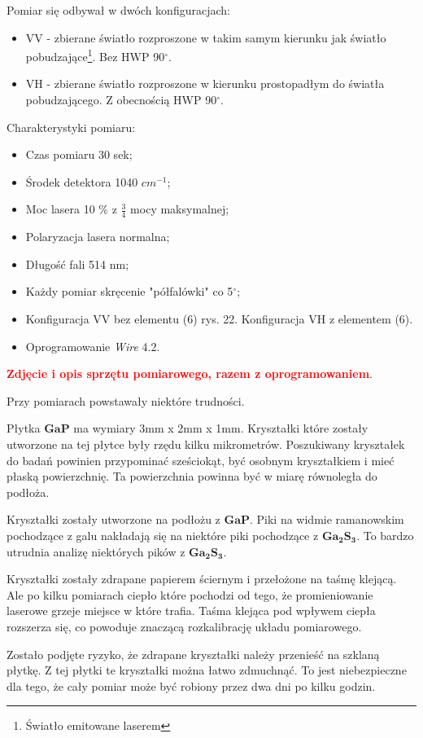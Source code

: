 Pomiar się odbywał w dwóch konfiguracjach:
\begin{itemize}
	\item VV - zbierane światło rozproszone w takim samym kierunku jak światło pobudzające\footnote{Światło emitowane laserem}. Bez HWP 90$^{\circ}$.
	\item VH - zbierane światło rozproszone w kierunku prostopadłym do światła pobudzającego. Z obecnością HWP 90$^{\circ}$.
\end{itemize} 

Charakterystyki pomiaru:
\begin{itemize}
	\item Czas pomiaru 30 sek;
	\item Środek detektora 1040 $cm^{-1}$;
	\item Moc lasera 10 \% z $\frac{3}{4}$ mocy maksymalnej;
	\item Polaryzacja lasera normalna;
	\item Długość fali 514 nm;
	\item Każdy pomiar skręcenie "półfalówki" co 5$^{\circ}$;
	\item Konfiguracja VV bez elementu (6) rys. 22. Konfiguracja VH z elementem (6).
	\item Oprogramowanie \textit{Wire} 4.2.
\end{itemize}

\textbf{\textcolor{red}{Zdjęcie i opis sprzętu pomiarowego, razem z oprogramowaniem}}.

Przy pomiarach powstawały niektóre trudności.

Płytka $\mathbf{GaP}$ ma wymiary 3mm x 2mm x 1mm. Kryształki które zostały utworzone na tej płytce były rzędu kilku mikrometrów. Poszukiwany kryształek do badań powinien przypominać sześciokąt, być osobnym kryształkiem i mieć płaską powierzchnię. Ta powierzchnia powinna być w miarę równoległa do podłoża.

Kryształki zostały utworzone na podłożu z $\mathbf{GaP}$. Piki na widmie ramanowskim pochodzące z galu nakładają się na niektóre piki pochodzące z $\mathbf{Ga_{2}S_{3}}$. To bardzo utrudnia analizę niektórych pików z $\mathbf{Ga_{2}S_{3}}$.

Kryształki zostały zdrapane papierem ściernym i przełożone na taśmę klejącą. Ale po kilku pomiarach ciepło które pochodzi od tego, że promieniowanie laserowe grzeje miejsce w które trafia. Taśma klejąca pod wpływem ciepła rozszerza się, co powoduje znaczącą rozkalibrację układu pomiarowego. 

Zostało podjęte ryzyko, że zdrapane kryształki należy przenieść na szklaną płytkę. Z tej płytki te kryształki można łatwo zdmuchnąć. To jest niebezpieczne dla tego, że cały pomiar może być robiony przez dwa dni po kilku godzin.

